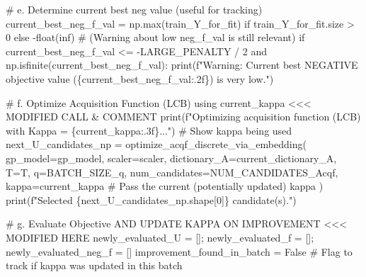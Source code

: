 \documentclass[
  letterpaper,
  DIV=11,
  numbers=noendperiod]{scrartcl}
\newenvironment{Shaded}{\begin{snugshade}}{\end{snugshade}}
\newcommand{\BuiltInTok}[1]{\textcolor[rgb]{0.00,0.23,0.31}{#1}}
\newcommand{\CommentTok}[1]{\textcolor[rgb]{0.37,0.37,0.37}{#1}}
\newcommand{\ControlFlowTok}[1]{\textcolor[rgb]{0.00,0.23,0.31}{#1}}
\newcommand{\DecValTok}[1]{\textcolor[rgb]{0.68,0.00,0.00}{#1}}
\newcommand{\KeywordTok}[1]{\textcolor[rgb]{0.00,0.23,0.31}{#1}}
\newcommand{\NormalTok}[1]{\textcolor[rgb]{0.00,0.23,0.31}{#1}}
\newcommand{\OperatorTok}[1]{\textcolor[rgb]{0.37,0.37,0.37}{#1}}
\newcommand{\SpecialCharTok}[1]{\textcolor[rgb]{0.37,0.37,0.37}{#1}}
\newcommand{\SpecialStringTok}[1]{\textcolor[rgb]{0.13,0.47,0.30}{#1}}
\newcommand{\StringTok}[1]{\textcolor[rgb]{0.13,0.47,0.30}{#1}}
\newcommand{\VariableTok}[1]{\textcolor[rgb]{0.07,0.07,0.07}{#1}}
\begin{document}
\begin{Shaded}
\begin{Highlighting}[]
    \CommentTok{\# e. Determine current best neg value (useful for tracking)}
\NormalTok{    current\_best\_neg\_f\_val }\OperatorTok{=}\NormalTok{ np.}\BuiltInTok{max}\NormalTok{(train\_Y\_for\_fit) }\ControlFlowTok{if}\NormalTok{ train\_Y\_for\_fit.size }\OperatorTok{\textgreater{}} \DecValTok{0} \ControlFlowTok{else} \OperatorTok{{-}}\BuiltInTok{float}\NormalTok{(}\StringTok{\textquotesingle{}inf\textquotesingle{}}\NormalTok{)}
    \CommentTok{\# (Warning about low neg\_f\_val is still relevant)}
    \ControlFlowTok{if}\NormalTok{ current\_best\_neg\_f\_val }\OperatorTok{\textless{}=} \OperatorTok{{-}}\NormalTok{LARGE\_PENALTY }\OperatorTok{/} \DecValTok{2} \KeywordTok{and}\NormalTok{ np.isfinite(current\_best\_neg\_f\_val):}
        \BuiltInTok{print}\NormalTok{(}\SpecialStringTok{f"Warning: Current best NEGATIVE objective value (}\SpecialCharTok{\{}\NormalTok{current\_best\_neg\_f\_val}\SpecialCharTok{:.2f\}}\SpecialStringTok{) is very low."}\NormalTok{)}

    \CommentTok{\# f. Optimize Acquisition Function (LCB) using current\_kappa \textless{}\textless{}\textless{} MODIFIED CALL \& COMMENT}
    \BuiltInTok{print}\NormalTok{(}\SpecialStringTok{f"Optimizing acquisition function (LCB) with Kappa = }\SpecialCharTok{\{}\NormalTok{current\_kappa}\SpecialCharTok{:.3f\}}\SpecialStringTok{..."}\NormalTok{) }\CommentTok{\# Show kappa being used}
\NormalTok{    next\_U\_candidates\_np }\OperatorTok{=}\NormalTok{ optimize\_acqf\_discrete\_via\_embedding(}
\NormalTok{        gp\_model}\OperatorTok{=}\NormalTok{gp\_model,}
\NormalTok{        scaler}\OperatorTok{=}\NormalTok{scaler,}
\NormalTok{        dictionary\_A}\OperatorTok{=}\NormalTok{current\_dictionary\_A,}
\NormalTok{        T}\OperatorTok{=}\NormalTok{T,}
\NormalTok{        q}\OperatorTok{=}\NormalTok{BATCH\_SIZE\_q,}
\NormalTok{        num\_candidates}\OperatorTok{=}\NormalTok{NUM\_CANDIDATES\_Acqf,}
\NormalTok{        kappa}\OperatorTok{=}\NormalTok{current\_kappa }\CommentTok{\# Pass the current (potentially updated) kappa}
\NormalTok{    )}
    \BuiltInTok{print}\NormalTok{(}\SpecialStringTok{f"Selected }\SpecialCharTok{\{}\NormalTok{next\_U\_candidates\_np}\SpecialCharTok{.}\NormalTok{shape[}\DecValTok{0}\NormalTok{]}\SpecialCharTok{\}}\SpecialStringTok{ candidate(s)."}\NormalTok{)}

    \CommentTok{\# g. Evaluate Objective AND UPDATE KAPPA ON IMPROVEMENT \textless{}\textless{}\textless{} MODIFIED HERE}
\NormalTok{    newly\_evaluated\_U }\OperatorTok{=}\NormalTok{ []}\OperatorTok{;}\NormalTok{ newly\_evaluated\_f }\OperatorTok{=}\NormalTok{ []}\OperatorTok{;}\NormalTok{ newly\_evaluated\_neg\_f }\OperatorTok{=}\NormalTok{ []}
\NormalTok{    improvement\_found\_in\_batch }\OperatorTok{=} \VariableTok{False} \CommentTok{\# Flag to track if kappa was updated in this batch}


\end{Highlighting}
\end{Shaded}
\end{document}
